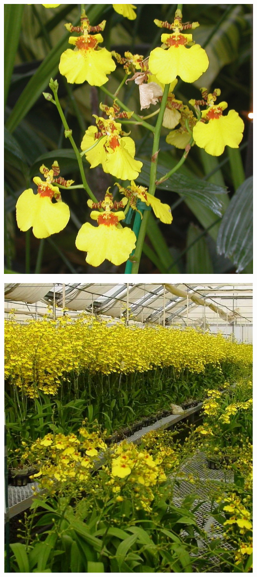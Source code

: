 \documentclass{article}
\begin{document}
\begin{center}
\includegraphics[height=0.9\textheight, angle=90]{../Orchid_Oncidium2.jpg}
\end{center}
\newpage

\begin{center}
\includegraphics[height=0.9\textheight, angle=90]{../Orchid_Oncidium_Plant.jpg}
\end{center}
\newpage
\end{document}
